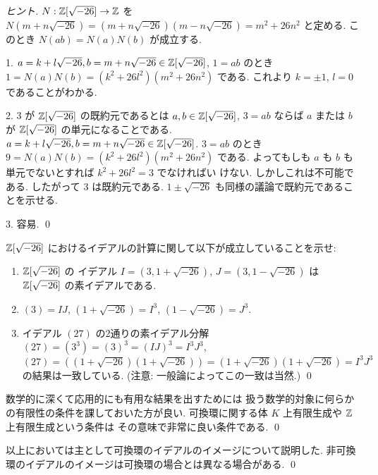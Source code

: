 \documentclass[12pt,twoside]{jarticle}
\begin{document}
\begin{proof}[ヒント]
 $N:{\mathbb Z}[\sqrt{-26}]\to{\mathbb Z}$ 
 を $N(m+n\sqrt{-26})=(m+n\sqrt{-26})(m-n\sqrt{-26})=m^2+26n^2$ と定める.
 このとき $N(ab)=N(a)N(b)$ が成立する.

 1. $a=k+l\sqrt{-26},b=m+n\sqrt{-26}\in{\mathbb Z}[\sqrt{-26}]$, $1=ab$ 
 のとき $1=N(a)N(b)=(k^2+26l^2)(m^2+26n^2)$ である.
 これより $k=\pm 1$, $l=0$ であることがわかる.

 2. $3$ が ${\mathbb Z}[\sqrt{-26}]$ の既約元であるとは %
 $a,b\in{\mathbb Z}[\sqrt{-26}]$, $3=ab$ ならば %
 $a$ または $b$ が ${\mathbb Z}[\sqrt{-26}]$ の単元になることである.
 $a=k+l\sqrt{-26},b=m+n\sqrt{-26}\in{\mathbb Z}[\sqrt{-26}]$. $3=ab$ 
 のとき $9=N(a)N(b)=(k^2+26l^2)(m^2+26n^2)$ である.
 よってもしも $a$ も $b$ も単元でないとすれば $k^2+26l^2=3$ でなければい
 けない. しかしこれは不可能である. したがって $3$ は既約元である.
 $1\pm\sqrt{-26}$ も同様の議論で既約元であることを示せる.

 3. 容易.
 \qed
\end{proof}

\begin{question}[20点以上]
 ${\mathbb Z}[\sqrt{-26}]$ におけるイデアルの計算に関して以下が成立していることを示せ:
 \begin{enumerate}
  \item ${\mathbb Z}[\sqrt{-26}]$ の
   イデアル $I=(3,1+\sqrt{-26})$, $J=(3,1-\sqrt{-26})$ は %
   ${\mathbb Z}[\sqrt{-26}]$ の素イデアルである.
  \item $(3)=IJ$, $(1+\sqrt{-26})=I^3$, $(1-\sqrt{-26})=J^3$.
  \item イデアル $(27)$ の2通りの素イデアル分解 %
   $(27)=(3^3)=(3)^3=(IJ)^3=I^3J^3$, %
   $(27)=((1+\sqrt{-26})(1+\sqrt{-26}))=(1+\sqrt{-26})(1+\sqrt{-26})=I^3J^3$ %
   の結果は一致している.
   (注意: 一般論によってこの一致は当然.)
   \qed
 \end{enumerate}
\end{question}

\begin{guide}
 数学的に深くて応用的にも有用な結果を出すためには
 扱う数学的対象に何らかの有限性の条件を課しておいた方が良い.
 可換環に関する体 $K$ 上有限生成や ${\mathbb Z}$ 上有限生成という条件は
 その意味で非常に良い条件である.
 \qed
\end{guide}

\begin{guide}
 以上においては主として可換環のイデアルのイメージについて説明した.
 非可換環のイデアルのイメージは可換環の場合とは異なる場合がある.
 \qed
\end{guide}
\end{document}
